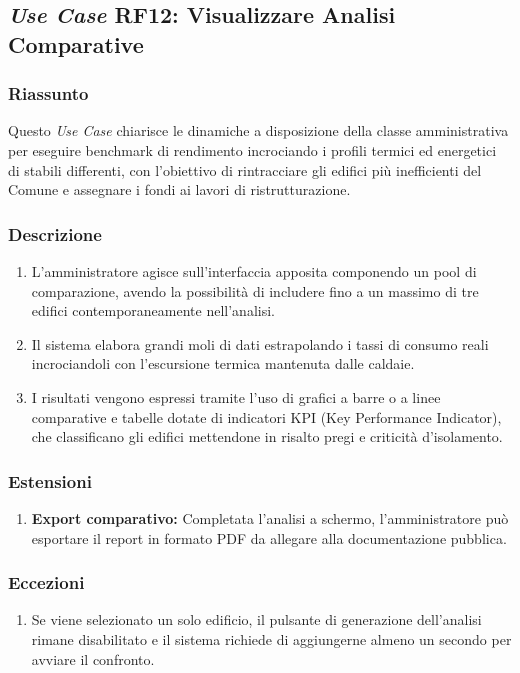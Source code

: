     \subsection*{\textit{Use Case} RF12: Visualizzare Analisi Comparative}
        \subsubsection*{Riassunto}
            Questo \textit{Use Case} chiarisce le dinamiche a disposizione della classe amministrativa per eseguire benchmark di rendimento incrociando i profili termici ed energetici di stabili differenti, con l'obiettivo di rintracciare gli edifici più inefficienti del Comune e assegnare i fondi ai lavori di ristrutturazione.
        \subsubsection*{Descrizione}
            \begin{enumerate}
                \item L'amministratore agisce sull'interfaccia apposita componendo un pool di comparazione, avendo la possibilità di includere fino a un massimo di tre edifici contemporaneamente nell'analisi.
                \item Il sistema elabora grandi moli di dati estrapolando i tassi di consumo reali incrociandoli con l'escursione termica mantenuta dalle caldaie.
                \item I risultati vengono espressi tramite l'uso di grafici a barre o a linee comparative e tabelle dotate di indicatori KPI (Key Performance Indicator), che classificano gli edifici mettendone in risalto pregi e criticità d'isolamento.
            \end{enumerate}
        \subsubsection*{Estensioni}
            \begin{enumerate}
                \item \textbf{Export comparativo:} Completata l'analisi a schermo, l'amministratore può esportare il report in formato PDF da allegare alla documentazione pubblica.
            \end{enumerate}
        \subsubsection*{Eccezioni}
            \begin{enumerate}
                \item Se viene selezionato un solo edificio, il pulsante di generazione dell'analisi rimane disabilitato e il sistema richiede di aggiungerne almeno un secondo per avviare il confronto.
            \end{enumerate}
